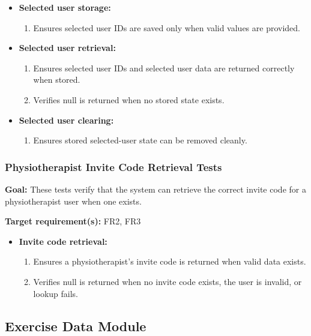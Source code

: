 \documentclass[12pt, titlepage]{article}
\begin{document}
\begin{itemize}
    \item \textbf{Selected user storage:}
    \begin{enumerate}
        \item Ensures selected user IDs are saved only when valid values are provided.
    \end{enumerate}

    \item \textbf{Selected user retrieval:}
    \begin{enumerate}
        \item Ensures selected user IDs and selected user data are returned correctly when stored.
        \item Verifies null is returned when no stored state exists.
    \end{enumerate}

    \item \textbf{Selected user clearing:}
    \begin{enumerate}
        \item Ensures stored selected-user state can be removed cleanly.
    \end{enumerate}
\end{itemize}


\subsubsection{Physiotherapist Invite Code Retrieval Tests}

\textbf{Goal:} These tests verify that the system can retrieve the correct invite code for a physiotherapist user when one exists.

\textbf{Target requirement(s):} FR2, FR3

\begin{itemize}
    \item \textbf{Invite code retrieval:}
    \begin{enumerate}
        \item Ensures a physiotherapist’s invite code is returned when valid data exists.
        \item Verifies null is returned when no invite code exists, the user is invalid, or lookup fails.
    \end{enumerate}
\end{itemize}


\subsection{Exercise Data Module}
\end{document}
